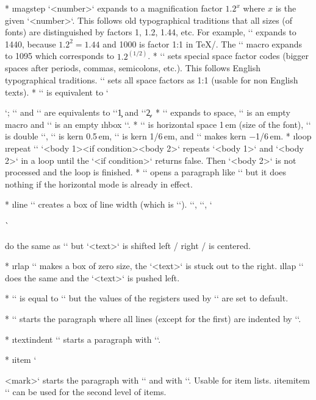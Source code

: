 {\begitems
* \i magstep `\magstep<number>` expands to a magnification factor $1.2^x$ where $x$ is the
  given `<number>`. This follows old typographical traditions that all sizes
  (of fonts) are distinguished by factors 1, 1.2, 1.44, etc.
  For example, `` expands to 1440, because $1.2^2=1.44$ 
  and 1000 is factor 1:1 in \TeX/. The \x`\magstephalf` macro expands to
  1095 which corresponds to $1.2^{(1/2)}$.
* \x`\nonfrenchspacing` sets special space factor codes (bigger spaces after
  periods, commas, semicolons, etc.). This follows English typographical
  traditions. \x`\frenchspacing` sets all space factors as 1:1 (usable for non
  English texts). 
* \x`\endgraf` is equivalent to \x`\par`; \x`\bgroup` and \x`\egroup` are
  equivalents to `{`\c1 and `}`\c2.
* \x`\space` expands to space, \x`\empty` is an empty macro and \x`\null` is an empty
  \i hbox `\hbox{}`.
* \x`\quad` is horizontal space 1\,em (size of the font), \x`\qquad` is
  double `\quad`,
  \x`\enspace` is kern 0.5\,em, \x`\thinspace` is kern 1/6\,em, and 
  \x`\negthinspace` makes kern $-$1/6\,em.
* \i loop \i repeat `\loop` \z`<body 1><if condition><body 2>\repeat`
  repeats \z`<body 1>` and \z`<body 2>` in a loop until the `<if condition>` returns
  false. Then \z`<body 2>` is not processed and the loop is finished.
* \x`\leavevmode` opens a paragraph like `\indent` but it does nothing if
  the horizontal mode is already in effect.

* \i line \z`` creates a box of line width (which is \x`\hsize`). 
  \x`\leftline`, \x`\rightline`, \x`\centerline` do the same as 
  `\line` but \z`<text>` is shifted left / right / is centered.

* \i rlap \z`` makes a box of zero size, the \z`<text>` is stuck
  out to the right. \i llap \z`` does the same and the \z`<text>` is pushed
  left. 

* \x`\ialign` is equal to `\halign` but the values of the registers used by
  `\halign` are set to default.

* \x`\hang` starts the paragraph where all lines (except for the first) are
  indented by `\parindent`.

* \i textindent `` starts a paragraph with ``. 

* \i item `\item{<mark>}` starts the paragraph with `\hang` and with
  ``. Usable for item lists.
  \i itemitem `` can be used for the second level of items.

}
